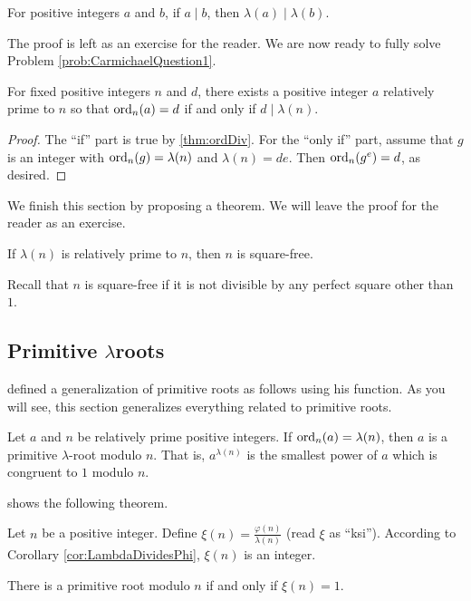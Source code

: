 \begin{theorem}
	For positive integers $a$ and $b$, if $a \mid b$, then $\lambda(a) \mid \lambda(b)$.
\end{theorem}
The proof is left as an exercise for the reader. We are now ready to fully solve Problem \ref{prob:CarmichaelQuestion1}.
\begin{theorem}
	For fixed positive integers $n$ and $d$, there exists a positive integer $a$  relatively prime to $n$ so that $\operatorname{ord}_n(a)=d$ if and only if $d \mid \lambda(n)$.
\end{theorem}

\begin{proof}
	The ``if'' part is true by \autoref{thm:ordDiv}. For the ``only if'' part, assume that $g$ is an integer with $\operatorname{ord}_n(g)=\lambda(n)$ and $\lambda(n)=de$. Then $\operatorname{ord}_n(g^e)=d$, as desired.
\end{proof}

We finish this section by proposing a theorem. We will leave the proof for the reader as an exercise.
	\begin{theorem}
		If $\lambda(n)$ is relatively prime to $n$, then $n$ is square-free.
	\end{theorem}
Recall that $n$ is square-free if it is not divisible by any perfect square other than $1$.

\subsection{Primitive \texorpdfstring{$\lambda$}{lambda}roots}
\textcite[Page $232-233$, Result II]{carmichael_1910} defined a generalization of primitive roots as follows using his function. As you will see, this section generalizes everything related to primitive roots.
\begin{definition}
	Let $a$ and $n$ be relatively prime positive integers. If $\operatorname{ord}_n(a)=\lambda(n)$, then $a$ is a primitive $\lambda$-root modulo $n$. That is, $a^{\lambda(n)}$ is the smallest power of $a$ which is congruent to $1$ modulo $n$.
\end{definition}
\textcite{cameron_preece_2014} shows the following theorem.
\begin{definition}
	Let $n$ be a positive integer. Define $\xi(n) = \frac{\varphi(n)}{\lambda(n)}$ (read $\xi$ as ``ksi''). According to Corollary \ref{cor:LambdaDividesPhi}, $\xi(n)$ is an integer.
\end{definition}

\begin{proposition}
 There is a primitive root modulo $n$ if and only if $\xi(n)=1$.
\end{proposition}

